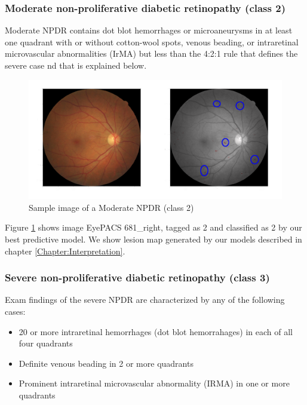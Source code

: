 \subsubsection*{Moderate non-proliferative diabetic retinopathy (class 2)}

Moderate NPDR contains dot blot hemorrhages or microaneurysms in at least one quadrant with or without cotton-wool spots, venous beading, or intraretinal microvascular abnormalities (IrMA) but less than the 4:2:1 rule that defines the severe case nd that is explained below.

\begin{figure}[ht!]
	\centering
	\includegraphics[width=\textwidth]{Figures/chapter_background/classes/class2.png}
	\caption{Sample image of a Moderate NPDR (class 2)} 
	\label{back:fig:class2_sample} 
\end{figure}

Figure \ref{back:fig:class2_sample} shows image EyePACS 681\_right, tagged as 2 and classified as 2 by our best predictive model. We show lesion map generated by our models described in chapter \ref{Chapter:Interpretation}.

\subsubsection*{Severe non-proliferative diabetic retinopathy (class 3)}

Exam findings of the severe NPDR are characterized by any of the following cases:

\begin{itemize}
	\item 20 or more intraretinal hemorrhages (dot blot hemorrahages) in each of all four quadrants
	\item Definite venous beading in 2 or more quadrants
	\item Prominent intraretinal microvascular abnormality (IRMA) in one or more quadrants
\end{itemize}

